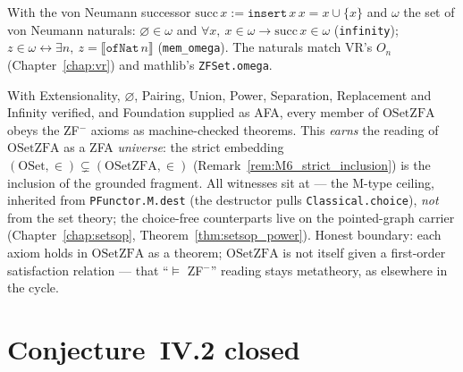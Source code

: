 \begin{theorem}[Infinity]
\label{thm:setszfa_zf3}
\leanok
{}
With the von Neumann successor $\mathrm{succ}\,x := \texttt{insert}\,x\,x =
x\cup\{x\}$ and $\omega$ the set of von Neumann naturals:
$\varnothing \in \omega$ and $\forall x,\ x \in \omega \to \mathrm{succ}\,x \in
\omega$ (\texttt{infinity}); $z \in \omega \leftrightarrow \exists n,\ z =
\llbracket\texttt{ofNat}\,n\rrbracket$ (\texttt{mem\_omega}).  The naturals match
VR's $O_n$ (Chapter~\ref{chap:vr}) and mathlib's \texttt{ZFSet.omega}.
\end{theorem}

\begin{finding}
\label{find:setszfa_zf}
\leanok
{}
With Extensionality, $\varnothing$, Pairing, Union, Power, Separation,
Replacement and Infinity verified, and Foundation supplied as AFA, every member
of $\mathrm{OSetZFA}$ obeys the ZF$^-$ axioms as machine-checked theorems.  This
\emph{earns} the reading of $\mathrm{OSetZFA}$ as a ZFA \emph{universe}: the
strict embedding $(\mathrm{OSet},\in)\subsetneq(\mathrm{OSetZFA},\in)$
(Remark~\ref{rem:M6_strict_inclusion}) is the inclusion of the grounded fragment.
All witnesses sit at  ---
the M-type ceiling, inherited from \texttt{PFunctor.M.dest} (the destructor pulls
\texttt{Classical.choice}), \emph{not} from the set theory; the choice-free
counterparts live on the pointed-graph carrier
(Chapter~\ref{chap:setsop}, Theorem~\ref{thm:setsop_power}).  Honest boundary:
each axiom holds in $\mathrm{OSetZFA}$ as a theorem; $\mathrm{OSetZFA}$ is not
itself given a first-order satisfaction relation --- that ``$\models$ ZF$^-$''
reading stays metatheory, as elsewhere in the cycle.
\end{finding}

\section{Conjecture~IV.2 closed}
\label{sec:setszfa_conjecture}

